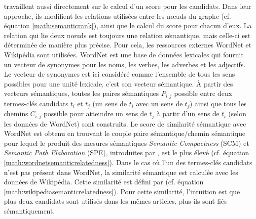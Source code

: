           \citet{tsatsaronis2010semanticrank} travaillent aussi directement sur
          le calcul d'un score pour les candidats. Dans leur approche, ils
          modifient les relations utilisées entre les n\oe{}uds du graphe (cf.
          équation \ref{math:semanticrank}), ainsi que le calcul du score pour
          chacun d'eux. La relation qui lie deux n\oe{}uds est toujours une
          relation sémantique, mais celle-ci est déterminée de manière plus
          précise. Pour cela, les ressources externes WordNet
          \citep{miller1995wordnet} et Wikipédia sont utilisées. WordNet est une
          base de données lexicales qui fournit un vecteur de synonymes pour les
          noms, les verbes, les adverbes et les adjectifs. Le vecteur de
          synonymes est ici considéré comme l'ensemble de tous les sens
          possibles pour une unité lexicale, c'est son vecteur sémantique. À
          partir des vecteurs sémantiques, toutes les paires sémantiques $P_{i,
          j}$ possible entre deux termes-clés candidats $t_i$ et $t_j$ (un sens
          de $t_i$ avec un sens de $t_j$) ainsi que tous les chemins $C_{i, j}$
          possible pour atteindre un sens de $t_j$ à partir d'un sens de $t_i$
          (selon les données de WordNet) sont construits. Le score de similarité
          sémantique avec WordNet est obtenu en trouvant le couple paire
          sémantique/chemin sémantique pour lequel le produit des mesures
          sémantiques \textit{Semantic Compactness} (SCM) et \textit{Semantic
          Path Elaboration} (SPE), introduites par
          \citet{tsatsaronis2010textrelatedness}, est le plus élevé (cf.
          équation \ref{math:wordnetsemanticrelatedness}). Dans le cas où l'un
          des termes-clés candidats n'est pas présent dans WordNet, la
          similarité sémantique est calculée avec les données de Wikipédia.
          Cette similarité est défini par
          \citet{milne2008wikipediasemanticrelatedness} (cf. équation
          \ref{math:wikipediasemanticrelatedness}). Pour cette similarité,
          l'intuition est que plus deux candidats sont utilisés dans les mêmes
          articles, plus ils sont liés sémantiquement.
